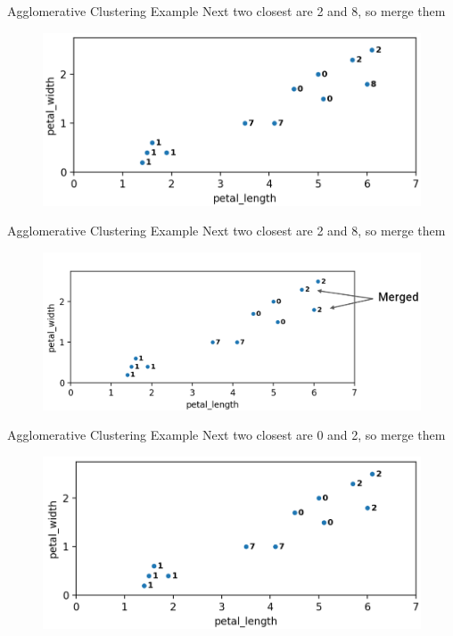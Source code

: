 \documentclass[aspectratio=169]{../latex_main/tntbeamer}  %
\begin{document}
	
	
	\begin{frame}{Agglomerative Clustering Example}
	    Next two closest are 2 and 8, so merge them
	    \begin{figure}
	        \centering
	        \includegraphics[scale=.35]{Bild44}
	    \end{figure}
	\end{frame}
	
	
	\begin{frame}{Agglomerative Clustering Example}
	    Next two closest are 2 and 8, so merge them
	    \begin{figure}
	        \centering
	        \includegraphics[scale=.35]{Bild45}
	    \end{figure}
	\end{frame}
	
	
	
	\begin{frame}{Agglomerative Clustering Example}
	    Next two closest are 0 and 2, so merge them
	    \begin{figure}
	        \centering
	        \includegraphics[scale=.35]{Bild46}
	    \end{figure}
	\end{frame}
	
\end{document}
